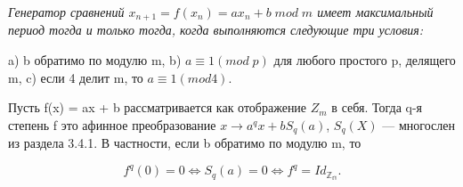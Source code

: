 \begin{thm}
\textit{Генератор сравнений $x_{n+1} = f(x_{n}) = ax_{n} + b \; mod \; m$ имеет максимальный период тогда и только тогда, когда выполняются следующие \linebreak три условия:} \par 
a) b обратимо по модулю m, \linebreak
\indent b) $a \equiv 1 (mod \; p)$ для любого простого p, делящего m, \linebreak
\indent c) если 4 делит m, то $a \equiv 1 (mod 4).$ \par
\end{thm}
\begin{lemma}
Пусть f(x) = ax + b рассматривается как отображение $Z_{m}$ в себя. \linebreak Тогда q-я степень f это афинное преобразование $x \to a^{q}x + bS_{q}(a)$, \linebreak $S_{q}(X)$ --- многослен из раздела 3.4.1. В частности, если b обратимо по \linebreak модулю m, то \par
$$f^{q}(0) = 0 \Leftrightarrow S_{q}(a) = 0 \Leftrightarrow f^{q} = Id_{\mathbb{Z_{m}}}.$$ \par
\end{lemma}

